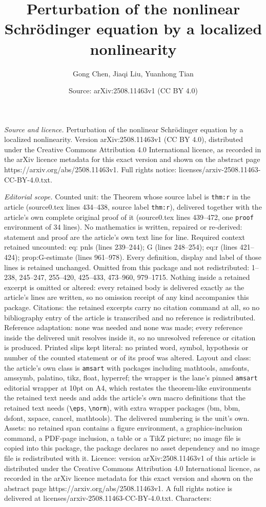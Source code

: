 \documentclass[10pt,a4paper]{amsart}
\title[Perturbation of the nonlinear Schr\"odinger equation by a lo]{Perturbation of the nonlinear Schr\"odinger equation by a localized nonlinearity}
\author{Gong Chen, Jiaqi Liu, Yuanhong Tian}
\date{Source: arXiv:2508.11463v1 (CC BY 4.0)}
\begin{document}
\maketitle

\noindent\emph{Source and licence.} Perturbation of the nonlinear Schr\"odinger equation by a localized nonlinearity. Version arXiv:2508.11463v1 (CC BY 4.0), distributed under the Creative Commons Attribution 4.0 International licence, as recorded in the arXiv licence metadata for this exact version and shown on the abstract page https://arxiv.org/abs/2508.11463v1. Full rights notice: licenses/arxiv-2508.11463-CC-BY-4.0.txt.\par\smallskip

\noindent\textit{Editorial scope.} Counted unit: the Theorem whose source label is \texttt{thm:r} in the article (source0.tex lines 434--438, source label \texttt{thm:r}), delivered together with the article's own complete original proof of it (source0.tex lines 439--472, one \texttt{proof} environment of 34 lines). No mathematics is written, repaired or re-derived: statement and proof are the article's own text line for line. Required context retained uncounted: eq: pnls (lines 239--244); G (lines 248--254); eq:r (lines 421--424); prop:G-estimate (lines 961--978). Every definition, display and label of those lines is retained unchanged. Omitted from this package and not redistributed: 1--238, 245--247, 255--420, 425--433, 473--960, 979--1715. Nothing inside a retained excerpt is omitted or altered: every retained body is delivered exactly as the article's lines are written, so no omission receipt of any kind accompanies this package. Citations: the retained excerpts carry no citation command at all, so no bibliography entry of the article is transcribed and no reference is redistributed. Reference adaptation: none was needed and none was made; every reference inside the delivered unit resolves inside it, so no unresolved reference or citation is produced. Printed slips kept literal: no printed word, symbol, hypothesis or number of the counted statement or of its proof was altered. Layout and class: the article's own class is \texttt{amsart} with packages including mathtools, amsfonts, amssymb, palatino, tikz, float, hyperref; the wrapper is the lane's pinned \texttt{amsart} editorial wrapper at 10pt on A4, which restates the theorem-like environments the retained text needs and adds the article's own macro definitions that the retained text needs (\texttt{\textbackslash eps}, \texttt{\textbackslash norm}), with extra wrapper packages (bm, bbm, dsfont, xspace, cancel, mathtools). The delivered numbering is the unit's own. Assets: no retained span contains a figure environment, a graphics-inclusion command, a PDF-page inclusion, a table or a TikZ picture; no image file is copied into this package, the package declares no asset dependency and no image file is redistributed with it. Licence: version arXiv:2508.11463v1 of this article is distributed under the Creative Commons Attribution 4.0 International licence, as recorded in the arXiv licence metadata for this exact version and shown on the abstract page https://arxiv.org/abs/2508.11463v1. A full rights notice is delivered at licenses/arxiv-2508.11463-CC-BY-4.0.txt. Characters: 
\end{document}
